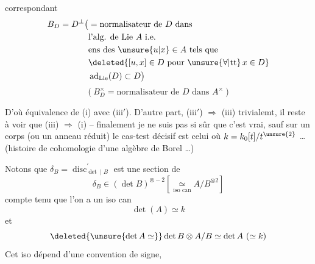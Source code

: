 correspondant
\[
\begin{aligned}
B_D=D^\perp\bigl(&=\text{normalisateur de }D\text{ dans}\\
&\text{l'alg. de Lie }A\text{ i.e.}\\
&\text{ens des }\unsure{u|x}\in A\text{ tels que}\\
&\deleted{[u,x]\in D\ \text{pour }\unsure{\forall|\text{tt}}\,x\in D}\\
&\operatorname{ad}_{\text{Lie}}(D)\subset D\bigr)
\end{aligned}
\]
\[
(B_D^\times=\text{normalisateur de }D\text{ dans }A^\times)
\]

D'où équivalence de (i) avec (iii$'$). D'autre part, (iii$'$) $\Rightarrow$ (iii) trivialemt, il reste à voir que (iii) $\Rightarrow$ (i) -- finalement je ne suis pas si sûr que c'est vrai, sauf sur un corps (ou un anneau réduit) le cas-test décisif est celui où $k=k_0[t]/t^{\unsure{2}}$ \ldots{} (histoire de cohomologie d'une algèbre de Borel \ldots)

 Notons que $\delta_B=\operatorname{disc}^{\prime}_{\det\mid B}$ est une section de
\[
\delta_B\in(\det B)^{\otimes-2}\left[\underset{\text{iso can}}{\simeq} A/B^{\otimes2}\right]
\]
compte tenu que l'on a un iso can
\[
\det(A)\simeq k
\]
et
\[
\deleted{\unsure{\det A\simeq}}\det B\otimes A/B\simeq\det A\ (\simeq k)
\]
Cet iso dépend d'une convention de signe,
